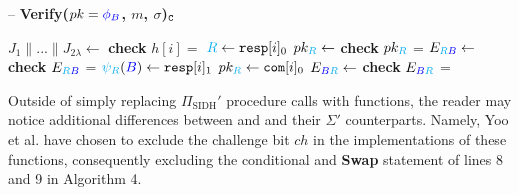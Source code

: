\begin{algorithm}[H]
\caption{-- \textbf{Verify($pk = \textcolor{blue}{\phi_B}$, $m$, $\sigma$)$_{\texttt{C}}$}}\label{alg:verifcode}
\begin{algorithmic}[1]
\State $J_{1} \parallel ... \parallel J_{2\lambda} \gets$ 
	\State \textbf{check} $h[i] =$ 
		\State $\textcolor{cyan}{R} \gets \texttt{resp}[i]_{0}$
		\State $pk_{\textcolor{cyan}{R}} \gets$ 
		\State \textbf{check} $pk_{\textcolor{cyan}{R}}$ = 
		\State $E_{\textcolor{cyan}{R}\textcolor{blue}{B}} \gets$ 
		\State \textbf{check} $E_{\textcolor{cyan}{R}\textcolor{blue}{B}}$ = 
	\Else
		\State $\textcolor{cyan}{\psi_R}(\textcolor{blue}{B}) \gets \texttt{resp}[i]_{1}$
		\State $pk_{\textcolor{cyan}{R}} \gets \texttt{com}[i]_{0}$
		\State $E_{\textcolor{blue}{B}\textcolor{cyan}{R}} \gets$ 
		\State \textbf{check} $E_{\textcolor{blue}{B}\textcolor{cyan}{R}}$ = 
	\EndIf
\EndFor

	\State {}
\Else
	\State {}
\EndIf
\end{algorithmic}
\end{algorithm}

Outside of simply replacing $\Pi_{\text{SIDH}}'$ procedure calls with \sidh functions, the reader may notice additional differences between  and  and their $\Sigma'$ counterparts. Namely, Yoo et al. have chosen to exclude the challenge bit $ch$ in the \sidh implementations of these functions, consequently excluding the conditional and \textbf{Swap} statement of lines 8 and 9 in Algorithm 4.
